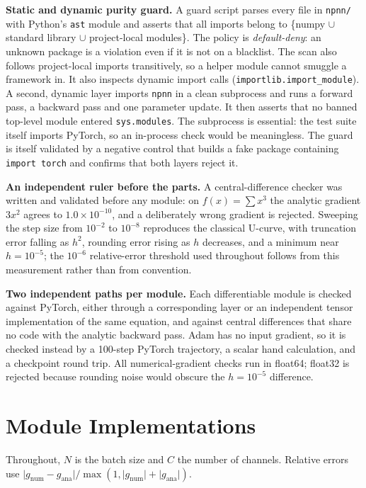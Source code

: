\documentclass[10pt]{article}
\begin{document}
\textbf{Static and dynamic purity guard.} A guard script parses every file in \texttt{npnn/} with
Python's \texttt{ast} module and asserts that all imports belong to \{numpy $\cup$ standard library
$\cup$ project-local modules\}. The policy is \emph{default-deny}: an unknown package is a violation
even if it is not on a blacklist. The scan also follows project-local imports transitively, so a
helper module cannot smuggle a framework in. It also inspects dynamic import calls
(\texttt{importlib.import\_module}). A second, dynamic layer imports \texttt{npnn} in a clean
subprocess and runs a forward pass, a backward pass and one parameter update. It then asserts that
no banned top-level module entered \texttt{sys.modules}. The subprocess is essential: the test suite
itself imports PyTorch, so an in-process check would be meaningless. The guard is itself validated
by a negative control that builds a fake package containing \texttt{import torch} and confirms that
both layers reject it.

\textbf{An independent ruler before the parts.} A central-difference checker was written and
validated before any module: on $f(x)=\sum x^3$ the analytic gradient $3x^2$ agrees to
$1.0\times10^{-10}$, and a deliberately wrong gradient is rejected. Sweeping the step size from
$10^{-2}$ to $10^{-8}$ reproduces the classical U-curve, with truncation error falling as $h^2$,
rounding error rising as $h$ decreases, and a minimum near $h=10^{-5}$; the $10^{-6}$ relative-error
threshold used throughout follows from this measurement rather than from convention.

\textbf{Two independent paths per module.} Each differentiable module is checked against PyTorch,
either through a corresponding layer or an independent tensor implementation of the same equation,
and against central differences that share no code with the analytic backward pass. Adam has no
input gradient, so it is checked instead by a 100-step PyTorch trajectory, a scalar hand calculation,
and a checkpoint round trip. All numerical-gradient checks run in float64; float32 is rejected because
rounding noise would obscure the $h=10^{-5}$ difference.

\section{Module Implementations}
\label{sec:partb-modules}

Throughout, $N$ is the batch size and $C$ the number of channels. Relative errors use
$\lvert g_{\text{num}}-g_{\text{ana}}\rvert/\max(1,\lvert g_{\text{num}}\rvert+\lvert g_{\text{ana}}\rvert)$.
\end{document}
